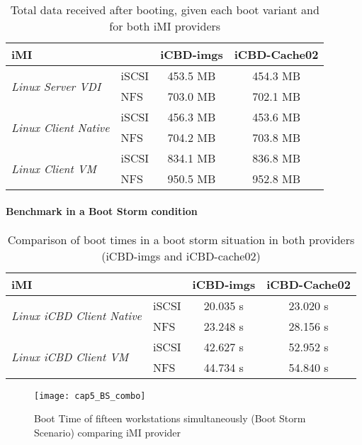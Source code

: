 \begin{table}[]
\centering
\begin{tabular}{llcc}
\textbf{iMI} &  & \textbf{iCBD-imgs} & \textbf{iCBD-Cache02} \\ \hline
\multirow{2}{*}{\textit{Linux Server VDI}} & iSCSI & 453.5 MB & 454.3 MB \\
 & NFS & 703.0 MB & 702.1 MB \\ \hline
\multirow{2}{*}{\textit{Linux Client Native}} & iSCSI & 456.3 MB & 453.6 MB \\
 & NFS & 704.2 MB & 703.8 MB \\ \hline
\multirow{2}{*}{\textit{Linux Client VM}} & iSCSI & 834.1 MB & 836.8 MB \\
 & NFS & 950.5 MB & 952.8 MB
\end{tabular}
\caption{Total data received after booting, given each boot variant and for both iMI providers}
\label{tab:boot_totaldata}
\end{table}



\paragraph{Benchmark in a Boot Storm condition}
\label{par:eval_cache_bootstorm}

\begin{table}[]
\centering
\begin{tabular}{llcc}
\textbf{iMI} & \textbf{} & \textbf{iCBD-imgs} & \textbf{iCBD-Cache02} \\ \hline
\multirow{2}{*}{\textit{Linux iCBD Client Native}} & iSCSI & 20.035 s & 23.020 s \\
 & NFS & 23.248 s & 28.156 s \\ \hline
\multirow{2}{*}{\textit{Linux iCBD Client VM}} & iSCSI & 42.627 s & 52.952 s \\
 & NFS & 44.734 s & 54.840 s
\end{tabular}
	\caption{Comparison of boot times in a boot storm situation in both providers (iCBD-imgs and iCBD-cache02)}
	\label{tab:bootstorm_both}
\end{table}


\begin{figure}[htbp]
	\centering
	\texttt{[image: cap5\_BS\_combo]}
	\caption{Boot Time of fifteen workstations simultaneously (Boot Storm Scenario) comparing iMI provider}
	\label{fig:bootstorm_time}
\end{figure}




